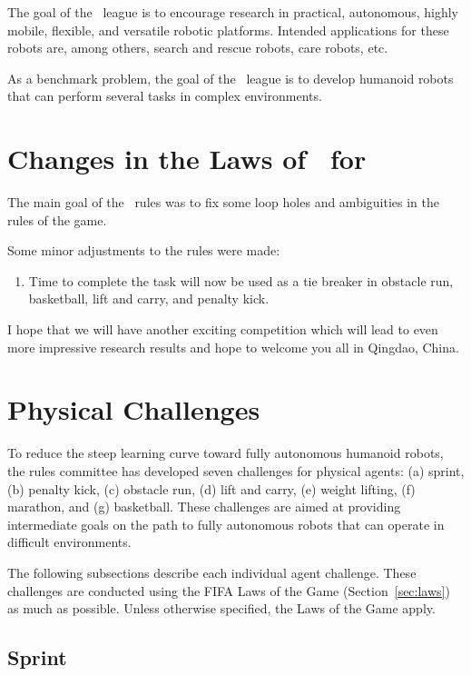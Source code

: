 \documentclass[12pt]{hurocup}
\begin{document}
The goal of the \HuroCup\ league is to encourage research in
practical, autonomous, highly mobile, flexible, and versatile robotic
platforms. Intended applications for these robots are, among others,
search and rescue robots, care robots, etc.

As a benchmark problem, the goal of the \HuroCup\ league is to develop
humanoid robots that can perform several tasks in complex environments.

\section{Changes in the Laws of \HuroCup\ for \thisyear}

The main goal of the \thisyear\ rules was to fix some loop holes and
ambiguities in the rules of the game.

Some minor adjustments to the rules were made:
\begin{enumerate}
\item Time to complete the task will now be used as a tie breaker in
  obstacle run, basketball, lift and carry, and penalty kick.
\end{enumerate}

I hope that we will have another exciting competition which will lead
to even more impressive research results and hope to welcome you all
in Qingdao, China.

\section{Physical Challenges}    
\label{sec:physical-challenges}

To reduce the steep learning curve toward fully autonomous humanoid
robots, the rules committee has developed seven challenges for
physical agents: (a) sprint, (b) penalty kick, (c) obstacle run, (d)
lift and carry, (e) weight lifting, (f) marathon, and (g)
basketball. These challenges are aimed at providing intermediate goals
on the path to fully autonomous robots that can operate in difficult
environments.

The following subsections describe each individual agent
challenge. These challenges are conducted using the FIFA Laws of the
Game (Section~\ref{sec:laws}) as much as possible. Unless otherwise
specified, the Laws of the Game apply.

\subsection{Sprint}
\label{subsec:sprint}
\end{document}
